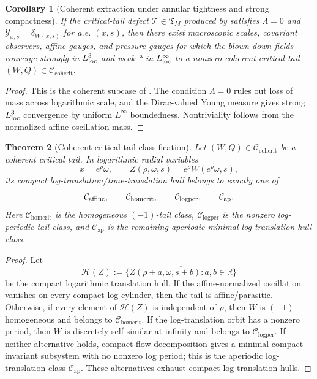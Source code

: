 \documentclass[11pt]{amsart}
\numberwithin{equation}{section}
\theoremstyle{plain}
\newtheorem{theorem}{Theorem}[section]
\newtheorem{corollary}[theorem]{Corollary}
\theoremstyle{definition}
\theoremstyle{remark}
\newcommand{\R}{\mathbb R}
\newcommand{\Ccohcrit}{\mathcal C_{\mathrm{cohcrit}}}
\newcommand{\Chomcrit}{\mathcal C_{\mathrm{homcrit}}}
\newcommand{\Tcrit}{\mathfrak T_M}
\newcommand{\Clogper}{\mathcal C_{\mathrm{logper}}}
\newcommand{\Capcrit}{\mathcal C_{\mathrm{ap}}}
\begin{document}
\begin{corollary}[Coherent extraction under annular tightness and strong compactness]
\label{cor:coherent-critical-tail-extraction}
If the critical-tail defect \(\mathcal T\in\Tcrit\) produced by
 satisfies
\(\Lambda=0\) and
\(\mathcal Y_{x,s}=\delta_{W(x,s)}\) for a.e. \((x,s)\), then there exist
macroscopic scales, covariant observers, affine gauges, and pressure gauges for
which the blown-down fields converge strongly in \(L^3_{\rm loc}\) and weak-*
in \(L^\infty_{\rm loc}\) to a nonzero coherent critical tail
\((W,Q)\in\Ccohcrit\).
\end{corollary}

\begin{proof}
This is the coherent subcase of
.  The condition
\(\Lambda=0\) rules out loss of mass across logarithmic scale, and the
Dirac-valued Young measure gives strong \(L^3_{\rm loc}\) convergence by
uniform \(L^\infty\) boundedness.  Nontriviality follows from the normalized
affine oscillation mass.
\end{proof}

\begin{theorem}[Coherent critical-tail classification]
\label{thm:coherent-critical-tail-classification}
Let \((W,Q)\in\Ccohcrit\) be a coherent critical tail.  In logarithmic radial
variables
\[
   x=e^\rho\omega,\qquad Z(\rho,\omega,s)=e^\rho W(e^\rho\omega,s),
\]
its compact log-translation/time-translation hull belongs to exactly one of
\[
   \mathcal C_{\rm affine},\qquad
   \Chomcrit,\qquad
   \Clogper,\qquad
   \Capcrit .
\]
Here \(\Chomcrit\) is the homogeneous \((-1)\)-tail class,
\(\Clogper\) is the nonzero log-periodic tail class, and \(\Capcrit\) is the
remaining aperiodic minimal log-translation hull class.
\end{theorem}

\begin{proof}
Let
\[
   \mathcal H(Z):=
   \overline{\{Z(\rho+a,\omega,s+b):a,b\in\R\}}
\]
be the compact logarithmic translation hull.  If the affine-normalized
oscillation vanishes on every compact log-cylinder, then the tail is
affine/parasitic.  Otherwise, if every element of \(\mathcal H(Z)\) is independent of
\(\rho\), then \(W\) is \((-1)\)-homogeneous and belongs to \(\Chomcrit\).  If
the log-translation orbit has a nonzero period, then \(W\) is discretely
self-similar at infinity and belongs to \(\Clogper\).  If neither alternative
holds, compact-flow decomposition gives a minimal compact invariant subsystem
with no nonzero log period; this is the aperiodic log-translation class
\(\Capcrit\).  These alternatives exhaust compact log-translation hulls.
\end{proof}
\end{document}
